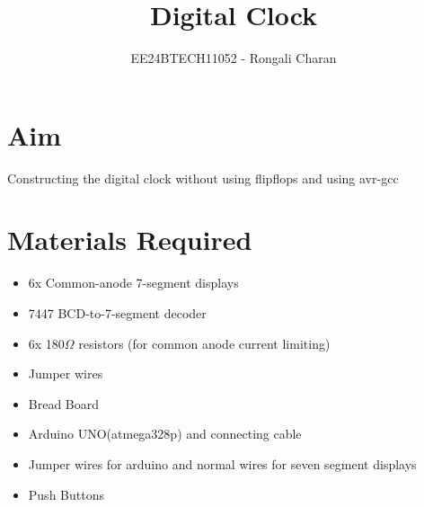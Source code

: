 \documentclass[journal]{IEEEtran}
\begin{document}

\vspace{3cm}

\title{Digital Clock}
\author{EE24BTECH11052 - Rongali Charan}
{\let\newpage\relax\maketitle}

\renewcommand{\thefigure}{\theenumi}
\renewcommand{\thetable}{\theenumi}
\setlength{\intextsep}{10pt} %


\renewcommand{\thetable}{\theenumi}
\tableofcontents
\newpage

\section{\textbf{Aim}}
Constructing the digital clock without using flipflops and using avr-gcc

    \section{ \textbf{Materials Required}}
\begin{itemize}
 \item 6x Common-anode 7-segment displays
    \item 7447 BCD-to-7-segment decoder
    \item 6x 180$\Omega$ resistors (for common anode current limiting)
    \item Jumper wires
    \item Bread Board
    \item Arduino UNO(atmega328p) and connecting cable
    \item Jumper wires for arduino and normal wires for seven segment displays
    \item Push Buttons
\end{itemize}
\end{document}
